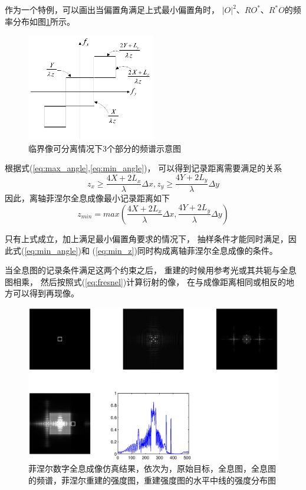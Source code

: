 \documentclass[11pt,a4paper]{article}
\begin{document}
作为一个特例，可以画出当偏置角满足上式最小偏置角时，
$|O|^2$、$RO^*$、$R^*O$的频率分布如图\ref{fig:spectrum}所示。
\begin{figure}[htb]
  \centering
  \includegraphics[width=0.5\textwidth]{spectrum.png}
  \caption{临界像可分离情况下3个部分的频谱示意图}
  \label{fig:spectrum}
\end{figure}

根据式(\ref{eq:max_angle},\ref{eq:min_angle})，
可以得到记录距离需要满足的关系
\begin{equation}
z_x\ge\frac{4X+2L_x}{\lambda}\Delta x,
z_y\ge\frac{4Y+2L_y}{\lambda}\Delta y
\end{equation}
因此，离轴菲涅尔全息成像最小记录距离如下
\begin{equation}
z_{min}=max(\frac{4X+2L_x}{\lambda}\Delta x, \frac{4Y+2L_y}{\lambda}\Delta y)
\label{eq:min_z}
\end{equation}

只有上式成立，加上满足最小偏置角要求的情况下，
抽样条件才能同时满足，因此式(\ref{eq:min_angle})和
(\ref{eq:min_z})同时构成离轴菲涅尔全息成像的条件。

当全息图的记录条件满足这两个约束之后，
重建的时候用参考光或其共轭与全息图相乘，
然后按照式(\ref{eq:fresnel})计算衍射的像，
在与成像距离相同或相反的地方可以得到再现像。
\begin{figure}[htb]
  \centering
  \includegraphics[width=\textwidth]{kuang.eps}
  \caption{菲涅尔数字全息成像仿真结果，依次为，原始目标，全息图，全息图的频谱，菲涅尔重建的强度图，重建强度图的水平中线的强度分布图}
  \label{fig:res_kuang}
\end{figure}
\end{document}
